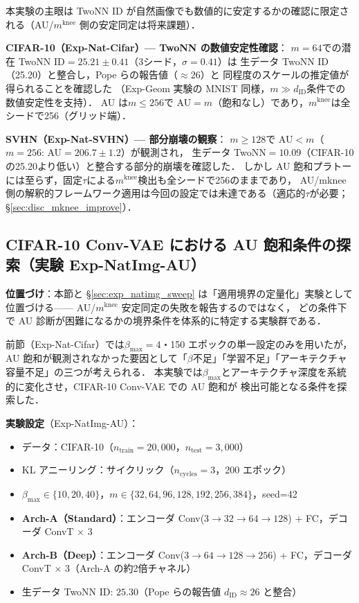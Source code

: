 \documentclass[11pt,a4paper]{jsarticle}
\newcommand{\mknee}{m^{\mathrm{knee}}}
\begin{document}
本実験の主眼は TwoNN ID が自然画像でも数値的に安定するかの確認に限定される（AU/$\mknee$ 側の安定同定は将来課題）．

\textbf{CIFAR-10（Exp-Nat-Cifar）— TwoNN の数値安定性確認}：
$m=64$での潜在 TwoNN ID$=25.21\pm0.41$（3シード，$\sigma=0.41$）は
生データ TwoNN ID（25.20）と整合し，Pope ら\cite{pope2021intrinsic}の報告値（$\approx 26$）と
同程度のスケールの推定値が得られることを確認した
（Exp-Geom 実験の MNIST 同様，$m \gg d_\mathrm{ID}$条件での数値安定性を支持）．
AU は$m \leq 256$で AU$=m$（飽和なし）であり，$\mknee$は全シードで256（グリッド端）．

\textbf{SVHN（Exp-Nat-SVHN）— 部分崩壊の観察}：
$m \geq 128$で AU$<m$（$m=256$: AU$=206.7\pm1.2$）が観測され，
生データ TwoNN$=10.09$（CIFAR-10の25.20より低い）と整合する部分的崩壊を確認した．
しかし AU 飽和プラトーには至らず，固定$\tau$による$\mknee$検出も全シードで256のままであり，
AU/mknee 側の解釈的フレームワーク適用は今回の設定では未達である（適応的$\tau$が必要；§\ref{sec:disc_mknee_improve}）．

\subsection{CIFAR-10 Conv-VAE における AU 飽和条件の探索（実験 Exp-NatImg-AU）}\label{sec:exp_natimg_au}

\textbf{位置づけ}：本節と §\ref{sec:exp_natimg_sweep} は「適用境界の定量化」実験として位置づける——
AU/$\mknee$ 安定同定の失敗を報告するのではなく，
どの条件下で AU 診断が困難になるかの境界条件を体系的に特定する実験群である．

前節（Exp-Nat-Cifar）では$\beta_{\max}=4$・150 エポックの単一設定のみを用いたが，
AU 飽和が観測されなかった要因として「$\beta$不足」「学習不足」「アーキテクチャ容量不足」の三つが考えられる．
本実験では$\beta_{\max}$とアーキテクチャ深度を系統的に変化させ，CIFAR-10 Conv-VAE での AU 飽和が
検出可能となる条件を探索した．

\textbf{実験設定}（Exp-NatImg-AU）：
\begin{itemize}
  \item データ：CIFAR-10（$n_{\mathrm{train}}=20{,}000$，$n_{\mathrm{test}}=3{,}000$）
  \item KL アニーリング：サイクリック（$n_{\mathrm{cycles}}=3$，200 エポック）
  \item $\beta_{\max} \in \{10, 20, 40\}$，$m \in \{32, 64, 96, 128, 192, 256, 384\}$，seed=42
  \item \textbf{Arch-A（Standard）}：エンコーダ Conv($3{\to}32{\to}64{\to}128$) + FC，デコーダ ConvT × 3
  \item \textbf{Arch-B（Deep）}：エンコーダ Conv($3{\to}64{\to}128{\to}256$) + FC，デコーダ ConvT × 3（Arch-A の約2倍チャネル）
  \item 生データ TwoNN ID: $25.30$（Pope ら\cite{pope2021intrinsic}の報告値 $d_\mathrm{ID} \approx 26$ と整合）
\end{itemize}
\end{document}
